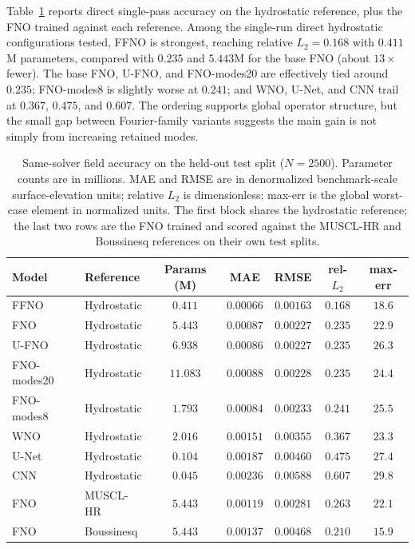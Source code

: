 Table~\ref{tab:accuracy} reports direct single-pass accuracy on the hydrostatic reference, plus the FNO trained against each reference. Among the single-run direct hydrostatic configurations tested, FFNO is strongest, reaching relative $L_2=0.168$ with $0.411$M parameters, compared with $0.235$ and $5.443$M for the base FNO (about $13 \times$ fewer). The base FNO, U-FNO, and FNO-modes20 are effectively tied around $0.235$; FNO-modes8 is slightly worse at $0.241$; and WNO, U-Net, and CNN trail at $0.367$, $0.475$, and $0.607$. The ordering supports global operator structure, but the small gap between Fourier-family variants suggests the main gain is not simply from increasing retained modes.

\begin{table}[H]
\centering
\caption{Same-solver field accuracy on the held-out test split ($N = 2500$). Parameter counts are in millions. MAE and RMSE are in denormalized benchmark-scale surface-elevation units; relative $L_2$ is dimensionless; max-err is the global worst-case element in normalized units. The first block shares the hydrostatic reference; the last two rows are the FNO trained and scored against the MUSCL-HR and Boussinesq references on their own test splits.}
\label{tab:accuracy}
\begin{tabular}{llccccc}
    \toprule
    Model & Reference & Params (M) & MAE & RMSE & rel-$L_2$ & max-err \\
    \midrule
    FFNO        & Hydrostatic & $0.411$  & $0.00066$ & $0.00163$ & $\mathbf{0.168}$ & $18.6$ \\
    FNO         & Hydrostatic & $5.443$  & $0.00087$ & $0.00227$ & $0.235$          & $22.9$ \\
    U-FNO       & Hydrostatic & $6.938$  & $0.00086$ & $0.00227$ & $0.235$          & $26.3$ \\
    FNO-modes20 & Hydrostatic & $11.083$ & $0.00088$ & $0.00228$ & $0.235$          & $24.4$ \\
    FNO-modes8  & Hydrostatic & $1.793$  & $0.00084$ & $0.00233$ & $0.241$          & $25.5$ \\
    WNO         & Hydrostatic & $2.016$  & $0.00151$ & $0.00355$ & $0.367$          & $23.3$ \\
    U-Net       & Hydrostatic & $0.104$  & $0.00187$ & $0.00460$ & $0.475$          & $27.4$ \\
    CNN         & Hydrostatic & $0.045$  & $0.00236$ & $0.00588$ & $0.607$          & $29.8$ \\
    \midrule
    FNO         & MUSCL-HR    & $5.443$  & $0.00119$ & $0.00281$ & $0.263$          & $22.1$ \\
    FNO         & Boussinesq  & $5.443$  & $0.00137$ & $0.00468$ & $0.210$          & $15.9$ \\
    \bottomrule
\end{tabular}
\end{table}

